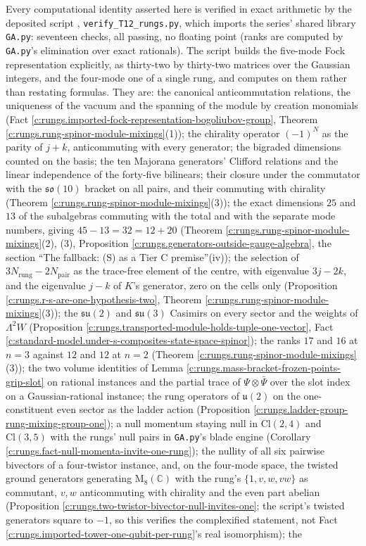 \documentclass[11pt]{article}
\theoremstyle{definition}
\theoremstyle{plain}
\providecommand{\C}{}\renewcommand{\C}{\mathbb{C}}
\providecommand{\Cl}{}\renewcommand{\Cl}{\mathrm{Cl}}
\providecommand{\su}{}\renewcommand{\su}{\mathfrak{su}}
\providecommand{\uu}{}\renewcommand{\uu}{\mathfrak{u}}
\begin{document}
\label{c:note.rungs.setting-machine-verification}
Every computational identity asserted here is verified in exact arithmetic by the deposited script \cite{ButlerVerifyT12R}, \texttt{verify\_T12\_rungs.py}, which imports the series' shared library \texttt{GA.py}: seventeen checks, all passing, no floating point (ranks are computed by \texttt{GA.py}'s elimination over exact rationals). The script builds the five-mode Fock representation explicitly, as thirty-two by thirty-two matrices over the Gaussian integers, and the four-mode one of a single rung, and computes on them rather than restating formulas. They are: the canonical anticommutation relations, the uniqueness of the vacuum and the spanning of the module by creation monomials (Fact \ref{c:rungs.imported-fock-representation-bogoliubov-group}, Theorem \ref{c:rungs.rung-spinor-module-mixings}(1)); the chirality operator $(-1)^{N}$ as the parity of $j + k$, anticommuting with every generator; the bigraded dimensions counted on the basis; the ten Majorana generators' Clifford relations and the linear independence of the forty-five bilinears; their closure under the commutator with the $\mathfrak{so}(10)$ bracket on all pairs, and their commuting with chirality (Theorem \ref{c:rungs.rung-spinor-module-mixings}(3)); the exact dimensions $25$ and $13$ of the subalgebras commuting with the total and with the separate mode numbers, giving $45 - 13 = 32 = 12 + 20$ (Theorem \ref{c:rungs.rung-spinor-module-mixings}(2), (3), Proposition \ref{c:rungs.generators-outside-gauge-algebra}, the section ``The fallback: (S) as a Tier C premise''(iv)); the selection of $3N_{\mathrm{rung}} - 2N_{\mathrm{pair}}$ as the trace-free element of the centre, with eigenvalue $3j - 2k$, and the eigenvalue $j - k$ of $K$'s generator, zero on the cells only (Proposition \ref{c:rungs.r-s-are-one-hypothesis-two}, Theorem \ref{c:rungs.rung-spinor-module-mixings}(3)); the $\su(2)$ and $\su(3)$ Casimirs on every sector and the weights of $\Lambda^{2}W$ (Proposition \ref{c:rungs.transported-module-holds-tuple-one-vector}, Fact \ref{c:standard-model.under-s-composites-state-space-spinor}); the ranks $17$ and $16$ at $n = 3$ against $12$ and $12$ at $n = 2$ (Theorem \ref{c:rungs.rung-spinor-module-mixings}(3)); the two volume identities of Lemma \ref{c:rungs.mass-bracket-frozen-points-grip-slot} on rational instances and the partial trace of $\Psi \otimes \bar\Psi$ over the slot index on a Gaussian-rational instance; the rung operators of $\uu(2)$ on the one-constituent even sector as the ladder action (Proposition \ref{c:rungs.ladder-group-rung-mixing-group-one}); a null momentum staying null in $\Cl(2,4)$ and $\Cl(3,5)$ with the rungs' null pairs in \texttt{GA.py}'s blade engine (Corollary \ref{c:rungs.fact-null-momenta-invite-one-rung}); the nullity of all six pairwise bivectors of a four-twistor instance, and, on the four-mode space, the twisted ground generators generating $\mathrm{M}_{8}(\C)$ with the rung's $\{1, v, w, vw\}$ as commutant, $v, w$ anticommuting with chirality and the even part abelian (Proposition \ref{c:rungs.two-twistor-bivector-null-invites-one}; the script's twisted generators square to $-1$, so this verifies the complexified statement, not Fact \ref{c:rungs.imported-tower-one-qubit-per-rung}'s real isomorphism); the 
\end{document}
